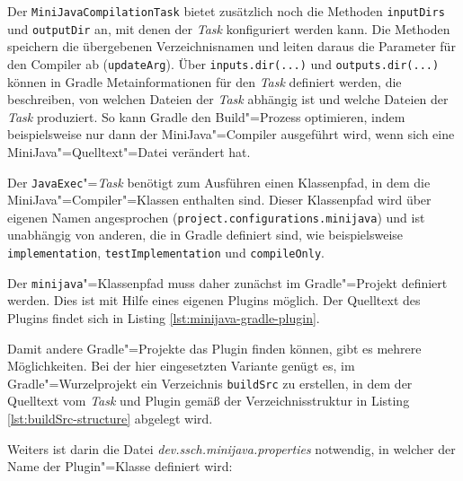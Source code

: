 

\pagebreak
Der \lstinline{MiniJavaCompilationTask} bietet zusätzlich noch die Methoden \lstinline{inputDirs} und \lstinline{outputDir} an, mit denen der \emph{Task} konfiguriert werden kann. Die Methoden speichern die übergebenen Verzeichnisnamen und leiten daraus die Parameter für den Compiler ab (\lstinline{updateArg}). Über \lstinline{inputs.dir(...)} und \lstinline{outputs.dir(...)} können in Gradle Metainformationen für den \emph{Task} definiert werden, die beschreiben, von welchen Dateien der \emph{Task} abhängig ist und welche Dateien der \emph{Task} produziert. So kann Gradle den Build"=Prozess optimieren, indem beispielsweise nur dann der MiniJava"=Compiler ausgeführt wird, wenn sich eine MiniJava"=Quelltext"=Datei verändert hat.

Der \lstinline{JavaExec}"=\emph{Task} benötigt zum Ausführen einen Klassenpfad, in dem die MiniJava"=Compiler"=Klassen enthalten sind. Dieser Klassenpfad wird über eigenen Namen angesprochen (\lstinline{project.configurations.minijava}) und ist unabhängig von anderen, die in Gradle definiert sind, wie beispielsweise \lstinline{implementation}, \lstinline{testImplementation} und \lstinline{compileOnly}.

Der \lstinline{minijava}"=Klassenpfad muss daher zunächst im Gradle"=Projekt definiert werden. Dies ist mit Hilfe eines eigenen Plugins möglich. Der Quelltext des Plugins findet sich in Listing \ref{lst:minijava-gradle-plugin}.



Damit andere Gradle"=Projekte das Plugin finden können, gibt es mehrere Möglichkeiten. Bei der hier eingesetzten Variante genügt es, im Gradle"=Wurzelprojekt ein Verzeichnis \lstinline{buildSrc} zu erstellen, in dem der Quelltext vom \emph{Task} und Plugin gemäß der Verzeichnisstruktur in Listing \ref{lst:buildSrc-structure} abgelegt wird.



Weiters ist darin die Datei \emph{dev.ssch.minijava.properties} notwendig, in welcher der Name der Plugin"=Klasse definiert wird:

